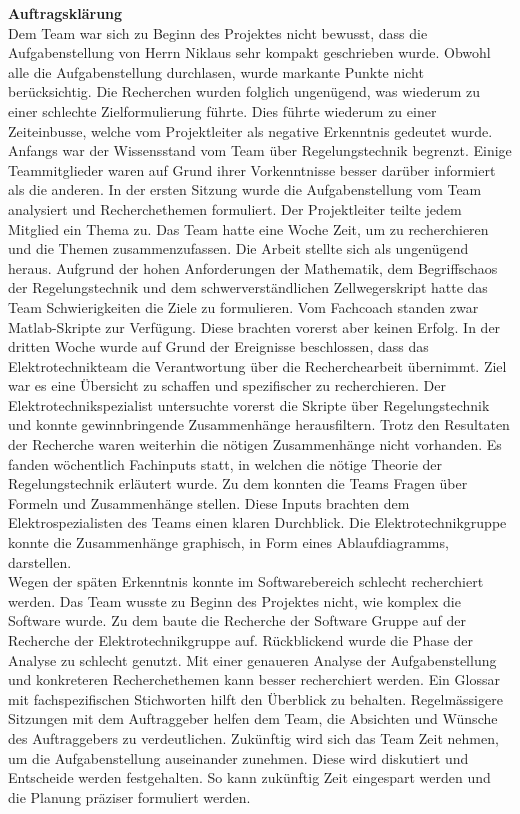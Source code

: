 \textbf{Auftragsklärung}\\
Dem Team war sich zu Beginn des Projektes nicht bewusst, dass die Aufgabenstellung von Herrn Niklaus sehr kompakt geschrieben wurde. Obwohl alle die Aufgabenstellung durchlasen, wurde markante Punkte nicht berücksichtig. Die Recherchen wurden folglich ungenügend, was wiederum zu einer schlechte Zielformulierung führte. Dies führte wiederum zu einer Zeiteinbusse, welche vom Projektleiter als negative Erkenntnis gedeutet wurde.\\ 
Anfangs war der Wissensstand vom Team über Regelungstechnik begrenzt. Einige Teammitglieder waren auf Grund ihrer Vorkenntnisse besser darüber informiert als die anderen. In der ersten Sitzung wurde die Aufgabenstellung vom Team analysiert und Recherchethemen formuliert. Der Projektleiter teilte jedem Mitglied ein Thema zu. Das Team hatte eine Woche Zeit, um zu recherchieren und die Themen zusammenzufassen. Die Arbeit stellte sich als ungenügend heraus. Aufgrund der hohen Anforderungen der Mathematik, dem Begriffschaos der Regelungstechnik und dem schwerverständlichen Zellwegerskript hatte das Team Schwierigkeiten die Ziele zu formulieren. Vom Fachcoach standen zwar Matlab-Skripte zur Verfügung. Diese brachten vorerst aber keinen Erfolg. In der dritten Woche wurde auf Grund der Ereignisse beschlossen, dass das Elektrotechnikteam die Verantwortung über die Recherchearbeit übernimmt. Ziel war es eine Übersicht zu schaffen und spezifischer zu recherchieren. Der Elektrotechnikspezialist untersuchte vorerst die Skripte über Regelungstechnik und konnte gewinnbringende Zusammenhänge herausfiltern. Trotz den Resultaten der Recherche waren weiterhin die nötigen Zusammenhänge nicht vorhanden. Es fanden wöchentlich Fachinputs statt, in welchen die nötige Theorie der Regelungstechnik erläutert wurde. Zu dem konnten die Teams Fragen über Formeln und Zusammenhänge stellen. Diese Inputs brachten dem Elektrospezialisten des Teams einen klaren Durchblick. Die Elektrotechnikgruppe konnte die Zusammenhänge graphisch, in Form eines Ablaufdiagramms, darstellen.\\
Wegen der späten Erkenntnis konnte im Softwarebereich schlecht recherchiert werden. Das Team wusste zu Beginn des Projektes nicht, wie komplex die Software wurde. Zu dem baute die Recherche der Software Gruppe auf der Recherche der Elektrotechnikgruppe auf. 
Rückblickend wurde die Phase der Analyse zu schlecht genutzt. Mit einer genaueren Analyse der Aufgabenstellung und konkreteren Recherchethemen kann besser recherchiert werden. Ein Glossar mit fachspezifischen Stichworten hilft den Überblick zu behalten. Regelmässigere Sitzungen mit dem Auftraggeber helfen dem Team, die Absichten und Wünsche des Auftraggebers zu verdeutlichen.
Zukünftig wird sich das Team Zeit nehmen, um die Aufgabenstellung auseinander zunehmen. Diese wird diskutiert und Entscheide werden festgehalten. So kann zukünftig Zeit eingespart werden und die Planung präziser formuliert werden.

